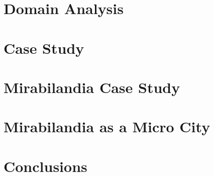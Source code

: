 \documentclass{report}
\begin{document}
\maketitle
\tableofcontents
\clearpage

\chapter{Domain Analysis}\label{chap:domain-analysis}






\chapter{Case Study}\label{chap:case-study}






\chapter{Mirabilandia Case Study}\label{chap:mira-case-study}



\chapter{Mirabilandia as a Micro City}\label{chap:mira-micro-city}


\chapter{Conclusions}\label{chap:conclusions}


\nocite{*}
\newpage
\printbibliography[heading=bibintoc]
\end{document}

